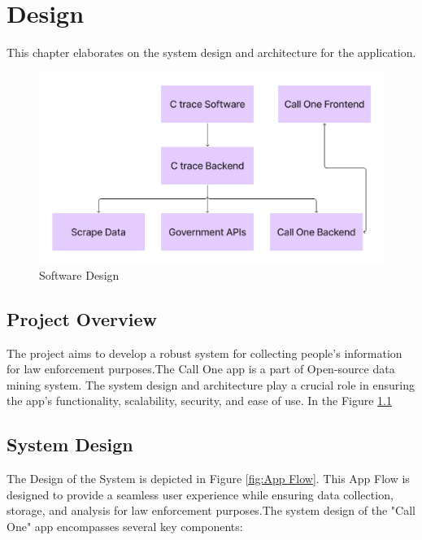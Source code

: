 \chapter{Design}\label{ch:design}
\justify

This chapter elaborates on the system design and architecture for the {\myprojectname} application.


\begin{figure}
    \centering
    \includegraphics[width=1\linewidth]{Media//Chapter 4//img}
    \caption{Software Design}
    \label{fig:Software Design}
\end{figure}


\section{Project Overview}\label{sec:project-overview}

The {\myprojectname} project aims to develop a robust system for collecting people's information for law enforcement purposes.The Call One app is a part of Open-source data mining system.
The system design and architecture play a crucial role in ensuring the app's functionality, scalability, security, and ease of use.
In the Figure \ref{fig:Software Design}

\section{System Design}\label{sec:system-design}

The Design of the System is depicted in Figure \ref{fig:App Flow}.
This App Flow is designed to provide a seamless user experience while ensuring data collection, storage, and analysis for law enforcement purposes.The system design of the "Call One" app encompasses several key components:

